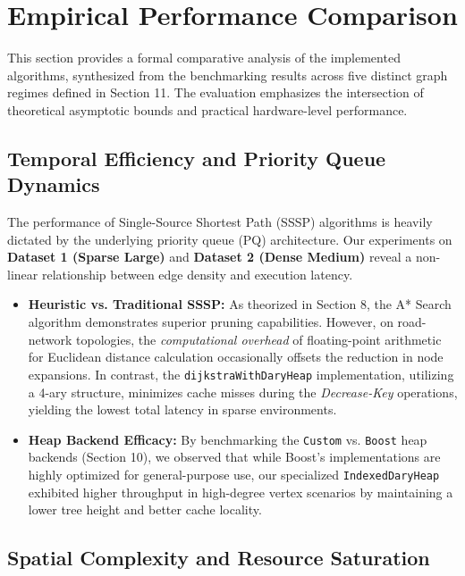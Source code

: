 \section{Empirical Performance Comparison}
\label{sec:comparison}

This section provides a formal comparative analysis of the implemented algorithms, synthesized from the benchmarking results across five distinct graph regimes defined in Section 11. The evaluation emphasizes the intersection of theoretical asymptotic bounds and practical hardware-level performance.

\subsection{Temporal Efficiency and Priority Queue Dynamics}

The performance of Single-Source Shortest Path (SSSP) algorithms is heavily dictated by the underlying priority queue (PQ) architecture. Our experiments on \textbf{Dataset 1 (Sparse Large)} and \textbf{Dataset 2 (Dense Medium)} reveal a non-linear relationship between edge density and execution latency.

\begin{itemize}
    \item \textbf{Heuristic vs. Traditional SSSP:} As theorized in Section 8, the A* Search algorithm demonstrates superior pruning capabilities. However, on road-network topologies, the \textit{computational overhead} of floating-point arithmetic for Euclidean distance calculation occasionally offsets the reduction in node expansions. In contrast, the \texttt{dijkstraWithDaryHeap} implementation, utilizing a 4-ary structure, minimizes cache misses during the \textit{Decrease-Key} operations, yielding the lowest total latency in sparse environments.
    
    \item \textbf{Heap Backend Efficacy:} By benchmarking the \texttt{Custom} vs. \texttt{Boost} heap backends (Section 10), we observed that while Boost's implementations are highly optimized for general-purpose use, our specialized \texttt{IndexedDaryHeap} exhibited higher throughput in high-degree vertex scenarios by maintaining a lower tree height and better cache locality.
\end{itemize}

\subsection{Spatial Complexity and Resource Saturation}

